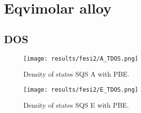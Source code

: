 \chapter{Eqvimolar alloy}
\label{appendix:eqvi}

\section{DOS}

\begin{figure}[H]
	\centering
	\texttt{[image: results/fesi2/A\_TDOS.png]}
	\caption{Density of states SQS A  with PBE.}
\end{figure}

\begin{figure}[H]
	\centering
	\texttt{[image: results/fesi2/E\_TDOS.png]}
	\caption{Density of states SQS E  with PBE.}
\end{figure}